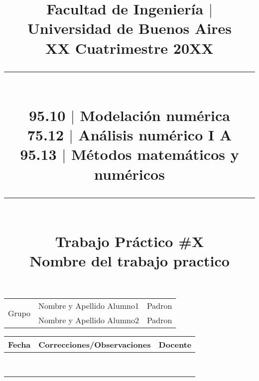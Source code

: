 \documentclass[a4paper,12pt]{article}
\title{
	\vspace{-3cm}
		{\small Facultad de Ingeniería $\vert$ Universidad de Buenos Aires} \\
		{\small XX Cuatrimestre 20XX} \\
	\rule{400pt}{3pt}\\
		{\Large \textbf{95.10 $\vert$ Modelación numérica} }\\ \vspace{-0.3cm}
		{\large \textbf{75.12 $\vert$ Análisis numérico I A} }\\ \vspace{-0.3cm}
		{\large \textbf{95.13 $\vert$ Métodos matemáticos y numéricos} }
	\vspace{0.2cm}
	\rule{400pt}{3pt}\\
		{\Large \textbf{ Trabajo Práctico \#X} } \\ \vspace{0.5cm}
		{\Large \textbf{Nombre del trabajo practico}}
	\vspace{-2cm}
	\date{}
}
\begin{document}
\maketitle


\setlength{\arrayrulewidth}{0.5mm}
\setlength{\tabcolsep}{31pt}
\renewcommand{\arraystretch}{1.5}
\thispagestyle{empty} %

\begin{center}
\begin{tabular}{ |c|c|c| } 
	\hline
	\multirow{2}{3.2em}{Grupo \centering{Nº}} & Nombre y Apellido Alumno1 & Padron \\ 
	\cline{2 - 3}
	
	& Nombre y Apellido Alumno2 & Padron \\ 
	\hline
\end{tabular}
\end{center}


\setlength{\arrayrulewidth}{0.5mm}
\setlength{\tabcolsep}{27pt}
\renewcommand{\arraystretch}{1.5}

\begin{center}
\begin{tabular}{ |c|c|c| } 
	\hline
	\textbf{Fecha} & \textbf{Correcciones/Observaciones} & \textbf{Docente} \\ 
	\hline
	& &  \\
	
	& &  \\
	
	& &  \\
	
	& &  \\
	
	& &  \\
	
	& &  \\
	
	& &  \\
	
	& &  \\
	\hline
\end{tabular}
\end{center}


\setlength{\tabcolsep}{37.5pt}
\renewcommand{\arraystretch}{1.8}
\end{document}
